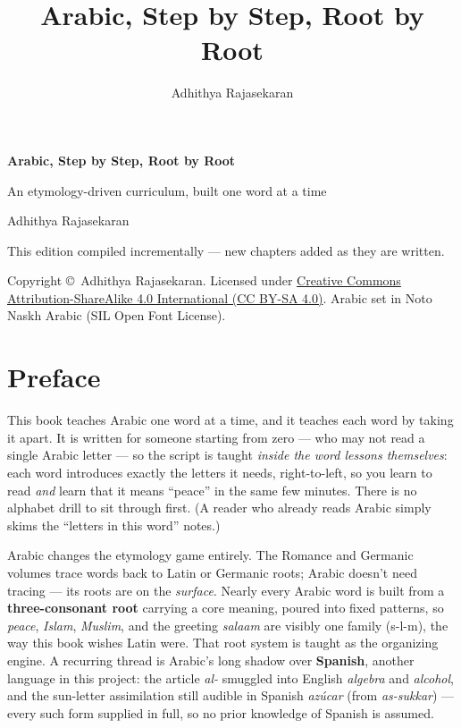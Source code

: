 \documentclass[11pt,twoside]{book}
\title{\Huge Arabic, Step by Step, Root by Root}
\author{Adhithya Rajasekaran}
\date{}
\begin{document}
\frontmatter

\begin{titlepage}
  \centering
  \vspace*{3cm}
  {\Huge\bfseries Arabic, Step by Step, Root by Root\par}
  \vspace{1cm}
  {\Large An etymology-driven curriculum, built one word at a time\par}
  \vspace{1.5cm}
  {\large Adhithya Rajasekaran\par}
  \vfill
  {\large This edition compiled incrementally --- new chapters added as they
  are written.\par}
  \vspace{2cm}
  {\normalsize
    Copyright \copyright\ Adhithya Rajasekaran. Licensed under
    \href{https://creativecommons.org/licenses/by-sa/4.0/}%
    {Creative Commons Attribution-ShareAlike 4.0 International (CC BY-SA 4.0)}.
    Arabic set in Noto Naskh Arabic (SIL Open Font License).\par
  }
\end{titlepage}

\chapter*{Preface}

This book teaches Arabic one word at a time, and it teaches each word by taking
it apart. It is written for someone starting from zero --- who may not read a
single Arabic letter --- so the script is taught \emph{inside the word lessons
themselves}: each word
introduces exactly the letters it needs, right-to-left, so you learn to read
 \emph{and} learn that it means ``peace'' in the same few minutes.
There is no alphabet drill to sit through first. (A reader who already reads
Arabic simply skims the ``letters in this word'' notes.)

Arabic changes the etymology game entirely. The Romance and Germanic volumes
trace words back to Latin or Germanic roots; Arabic doesn't need tracing --- its
roots are on the \emph{surface}. Nearly every Arabic word is built from a
\textbf{three-consonant root} carrying a core meaning, poured into fixed
patterns, so \emph{peace}, \emph{Islam}, \emph{Muslim}, and the greeting
\emph{salaam} are visibly one family (s-l-m), the way this book wishes
Latin were. That root system is taught as the organizing engine. A recurring
thread is Arabic's long shadow over \textbf{Spanish}, another language in this
project: the article \emph{al-} smuggled into English \emph{algebra} and
\emph{alcohol}, and the sun-letter assimilation still audible in Spanish
\emph{az\'{u}car} (from \emph{as-sukkar}) --- every such form supplied in full,
so no prior knowledge of Spanish is assumed.
\end{document}
